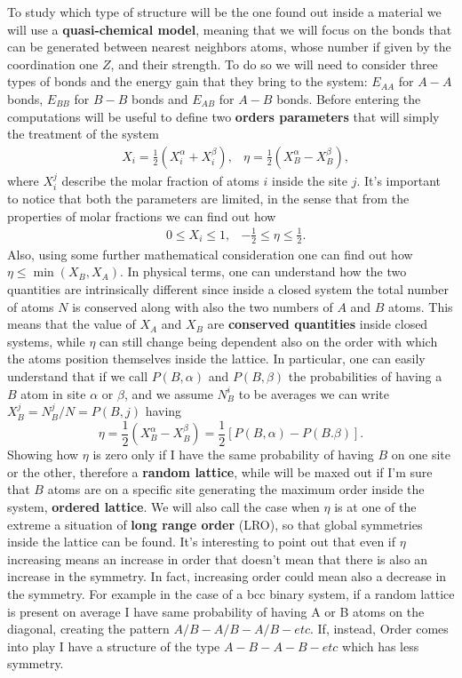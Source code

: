 To study which type of structure will be the one found out inside a material we will use a \textbf{quasi-chemical model}, meaning that we will focus on the bonds that can be generated between nearest neighbors atoms, whose number if given by the coordination one $Z$, and their strength. To do so we will need to consider three types of bonds and the energy gain that they bring to the system: $E_{AA}$ for $A-A$ bonds, $E_{BB}$ for $B-B$ bonds and $E_{AB}$ for $A-B$ bonds. Before entering the computations will be useful to define two \textbf{orders parameters} that will simply the treatment of the system
\begin{align}
    \label{eq:orderParameters}
    &X_i = \frac{1}{2}\left( X_i^\alpha + X_i^\beta \right), &\eta = \frac{1}{2}\left( X_B^\alpha - X_B^\beta \right),
\end{align}
where $X_i^j$ describe the molar fraction of atoms $i$ inside the site $j$. It's important to notice that both the parameters are limited, in the sense that from the properties of molar fractions we can find out how
\begin{align}
    &0 \le X_i \le 1, &-\frac{1}{2} \le \eta \le \frac{1}{2}.
\end{align}
Also, using some further mathematical consideration one can find out how $\eta \le \min(X_B, X_A)$. In physical terms, one can understand how the two quantities are intrinsically different since inside a closed system the total number of atoms $N$ is conserved along with also the two numbers of $A$ and $B$ atoms. This means that the value of $X_A$ and $X_B$ are \textbf{conserved quantities} inside closed systems, while $\eta$ can still change being dependent also on the order with which the atoms position themselves inside the lattice. In particular, one can easily understand that if we call $P(B, \alpha)$ and $P(B, \beta)$ the probabilities of having a $B$ atom in site $\alpha$ or $\beta$, and we assume $N_{B}^i$ to be averages we can write $X_B^j = N_B^j/N = P(B, j)$ having
\begin{equation}
    \eta = \frac{1}{2}\left( X_B^\alpha - X_B^\beta \right) = \frac{1}{2}\left[ P(B, \alpha) - P(B. \beta) \right].
\end{equation}
Showing how $\eta$ is zero only if I have the same probability of having $B$ on one site or the other, therefore a \textbf{random lattice}, while will be maxed out if I'm sure that $B$ atoms are on a specific site generating the maximum order inside the system, \textbf{ordered lattice}. We will also call the case when $\eta$ is at one of the extreme a situation of \textbf{long range order} (LRO), so that global symmetries inside the lattice can be found.
\nt
{
    It's interesting to point out that even if $\eta$ increasing means an increase in order that doesn't mean that there is also an increase in the symmetry. In fact, increasing order could mean also a decrease in the symmetry. For example in the case of a bcc binary system, if a random lattice is present on average I have same probability of having A or B atoms on the diagonal, creating the pattern $A/B-A/B-A/B-etc$. If, instead, Order comes into play I have a structure of the type $A-B-A-B-etc$ which has less symmetry.
}

